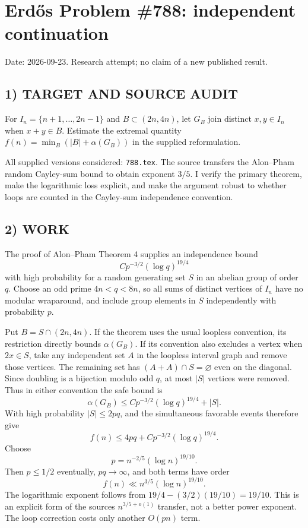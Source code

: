 \section{Erd\H{o}s Problem \#788: independent continuation}
\noindent Date: 2026-09-23. Research attempt; no claim of a new published result.
\subsection{1) TARGET AND SOURCE AUDIT}
For $I_n=\{n+1,\ldots,2n-1\}$ and $B\subset(2n,4n)$, let $G_B$ join distinct $x,y\in I_n$ when $x+y\in B$. Estimate the extremal quantity $f(n)=\min_B(|B|+\alpha(G_B))$ in the supplied reformulation.

All supplied versions considered: \texttt{788.tex}.
The source transfers the Alon--Pham random Cayley-sum bound to obtain exponent $3/5$. I verify the primary theorem, make the logarithmic loss explicit, and make the argument robust to whether loops are counted in the Cayley-sum independence convention.
\subsection{2) WORK}
The proof of Alon--Pham Theorem 4 supplies an independence bound
\[
C p^{-3/2}(\log q)^{19/4}
\]
with high probability for a random generating set $S$ in an abelian group of order $q$. Choose an odd prime $4n<q<8n$, so all sums of distinct vertices of $I_n$ have no modular wraparound, and include group elements in $S$ independently with probability $p$.

Put $B=S\cap(2n,4n)$. If the theorem uses the usual loopless convention, its restriction directly bounds $\alpha(G_B)$. If its convention also excludes a vertex when $2x\in S$, take any independent set $A$ in the loopless interval graph and remove those vertices. The remaining set has $(A+A)\cap S=\varnothing$ even on the diagonal. Since doubling is a bijection modulo odd $q$, at most $|S|$ vertices were removed. Thus in either convention the safe bound is
\[
\alpha(G_B)\le C p^{-3/2}(\log q)^{19/4}+|S|.
\]
With high probability $|S|\le2pq$, and the simultaneous favorable events therefore give
\[
f(n)\le4pq+C p^{-3/2}(\log q)^{19/4}.
\]
Choose
\[
p=n^{-2/5}(\log n)^{19/10}.
\]
Then $p\le1/2$ eventually, $pq\to\infty$, and both terms have order
\[
\boxed{f(n)\ll n^{3/5}(\log n)^{19/10}.}
\]
The logarithmic exponent follows from $19/4-(3/2)(19/10)=19/10$. This is an explicit form of the source\textquotesingle s $n^{3/5+o(1)}$ transfer, not a better power exponent. The loop correction costs only another $O(pn)$ term.
